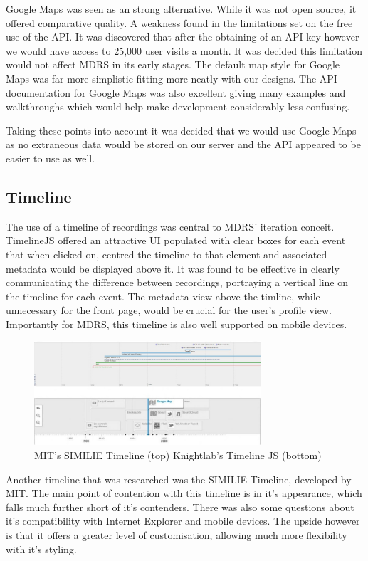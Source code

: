\documentclass{l3proj}
\begin{document}
Google Maps was seen as an strong alternative. While it was not open source, it offered comparative quality. A weakness found in the limitations set on the free use of the API. It was discovered that after the obtaining of an API key however we would have access to 25,000 user visits a month. It was decided this limitation would not affect MDRS in its early stages. The default map style for Google Maps was far more simplistic  fitting more neatly with our designs. The API documentation for Google Maps was also excellent giving many examples and walkthroughs which would help make development considerably less confusing.

Taking these points into account it was decided that we would use Google Maps as no extraneous data would be stored on our server and the API appeared to be easier to use as well.

\subsection{Timeline}

The use of a timeline of recordings was central to MDRS' iteration conceit. TimelineJS offered an attractive UI populated with clear boxes for each event that when clicked on, centred the timeline to that element and associated metadata would be displayed above it. It was found to be effective in clearly communicating the difference between recordings, portraying a vertical line on the timeline for each event. The metadata view above the timline, while unnecessary for the front page, would be crucial for the user's profile view. Importantly for MDRS, this timeline is also well supported on mobile devices.

\begin{figure}[ht!]
  \centering
\includegraphics[width=0.75\textwidth]{images/similie_knightlab_timeline.jpg}
\caption{MIT's SIMILIE Timeline (top) Knightlab's Timeline JS (bottom)}
\end{figure}

Another timeline that was researched was the SIMILIE Timeline, developed by MIT. The main point of contention with this timeline is in it's appearance, which falls much further short of it's contenders. There was also some questions about it's compatibility with Internet Explorer and mobile devices. The upside however is that it offers a greater level of customisation, allowing much more flexibility with it's styling.
\end{document}
